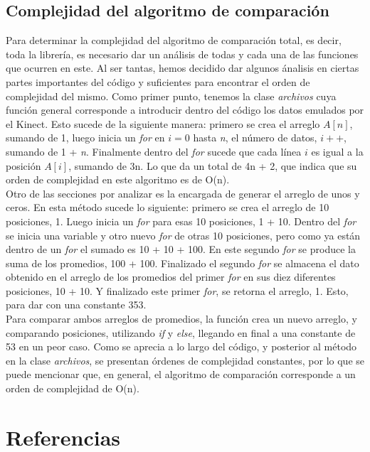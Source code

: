 \documentclass[letterpaper]{article}
\begin{document}
\subsection{Complejidad del algoritmo de comparación}

\quad \quad Para determinar la complejidad del algoritmo de comparación total, es decir, toda la librería, es necesario dar un análisis de todas y cada una de las funciones que ocurren en este. Al ser tantas, hemos decidido
dar algunos ánalisis en ciertas partes importantes del código y suficientes para encontrar el orden de complejidad del mismo. 
Como primer punto, tenemos la clase \textit{archivos} cuya función general corresponde a introducir dentro del código los datos emulados por el Kinect. Esto sucede de la siguiente manera: primero se crea el arreglo $A[n]$, sumando de 1, luego
inicia un \textit{for} en $i=0$ hasta \textit{n}, el número de datos, $i++$, sumando de 1 + \textit{n}. Finalmente dentro del \textit{for} sucede que cada línea $i$ es igual a la posición $A[i]$, sumando de 3n. Lo que da un total de 4n + 2, que indica que su orden de complejidad
en este algoritmo es de O(n).\\

Otro de las secciones por analizar es la encargada de generar el arreglo de unos y ceros. En esta método sucede lo siguiente: primero se crea el arreglo
de 10 posiciones, 1. Luego inicia un \textit{for} para esas 10 posiciones, 1 + 10. Dentro del \textit{for} se inicia una variable y otro nuevo \textit{for}
de otras 10 posiciones, pero como ya están dentro de un \textit{for} el sumado es 10 + 10 + 100. En este segundo \textit{for} se produce la suma de los promedios, 100 + 100. Finalizado el segundo \textit{for} se almacena
el dato obtenido en el arreglo de los promedios del primer \textit{for} en sus diez diferentes posiciones, 10 + 10. Y finalizado este primer \textit{for}, se retorna el arreglo, 1. Esto, para dar con una constante 353.\\

Para comparar ambos arreglos de promedios, la función crea un nuevo arreglo, y comparando posiciones, utilizando \textit{if} y \textit{else}, llegando en final a una constante de 53 en un peor caso. Como se aprecia
a lo largo del código, y posterior al método en la clase \textit{archivos}, se presentan órdenes de complejidad constantes, por lo que se puede
mencionar que, en general, el algoritmo de comparación corresponde a un orden de complejidad de O(n).


\section{Referencias}
\end{document}
